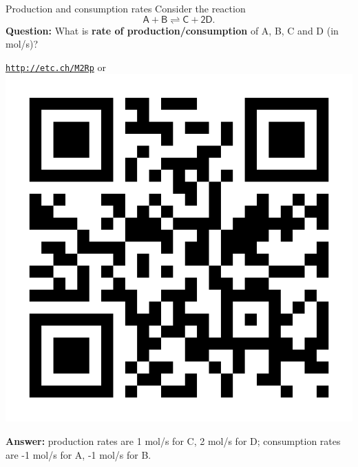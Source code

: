 \begin{frame}{Production and consumption rates}
	\vskip 10pt
Consider the reaction
	\[
	\mathsf{A+B\rightleftharpoons C+2D.}
	\]
%
\alert{\textbf{Question:}}  What is \textbf{rate of production\slash consumption}
of A, B, C and D (in mol/s)? \\
\begin{center}{ \href{http://etc.ch/M2Rp}{\textcolor{indigo(dye)}{\tt http://etc.ch/M2Rp}}} \quad
or \quad
\includegraphics[height=0.25\columnwidth]{figures/intro/poll-python-background.png}
\end{center}
\hiddenpause
\textbf{Answer:} production rates are 1 mol/s for C, 2 mol/s for D; consumption rates are -1 mol/s for A, -1 mol/s for B. 
\end{frame}
%
